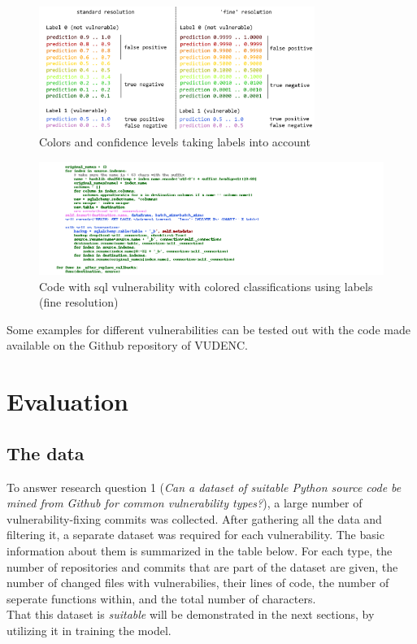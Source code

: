 \documentclass[
a4paper,
pagesize,
pdftex,
12pt,
twoside, %
BCOR=5mm, %
ngerman,
fleqn,
final,
]{scrartcl}
\begin{document}
	\begin{figure}[h]
		\centering
		\includegraphics[width=0.8\textwidth]{img/colorkeylabeled}
		\caption{Colors and confidence levels taking labels into account}
		\label{fig:examplecolored}
	\end{figure}


	\begin{figure}[h]
	\centering
	\includegraphics[width=1\textwidth]{img/exampleSQL.png}
	\caption{Code with sql vulnerability with colored classifications using labels (fine resolution)}
	\label{fig:example2}
	\end{figure}
	
	Some examples for different vulnerabilities can be tested out with the code made available on the Github repository of VUDENC.
	
	\newpage
	
	\section{Evaluation}\label{Results}
	
	\subsection{The data}
	
	To answer research question 1 (\textit{Can a dataset of suitable Python source code be mined from Github for common vulnerability types?}), a large number of vulnerability-fixing commits was collected. After gathering all the data and filtering it, a separate dataset was required for each vulnerability. The basic information about them is summarized in the table below. For each type, the number of repositories and commits that are part of the dataset are given, the number of changed files with vulnerabilies, their lines of code, the number of seperate functions within, and the total number of characters.\\
	That this dataset is \textit{suitable} will be demonstrated in the next sections, by utilizing it in training the model.
	
\end{document}

